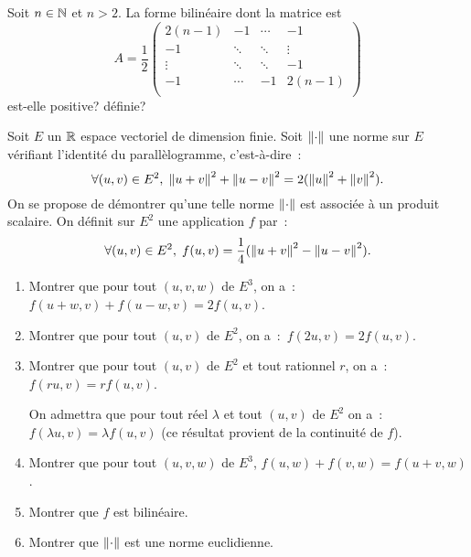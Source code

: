 \documentclass{tp_um}
\begin{document}
\exo[*]{} Soit $n\in\mathbb{N}$ et $n>2$. La forme bilinéaire dont la matrice est 
\[
        A =\frac{1}{2} \begin{pmatrix}
                2(n-1) & -1 & \cdots & -1 \\
                -1 & \ddots & \ddots & \vdots \\
                \vdots & \ddots & \ddots & -1 \\
                -1 & \cdots & -1 & 2(n-1) \\
        \end{pmatrix}
\]
est-elle positive? définie?

\newpage

Soit $E$ un $\mathbb{R}$ espace vectoriel de dimension finie. Soit $\lVert\cdot\rVert$ une norme sur $E$ vérifiant l'identité du parallèlogramme, c'est-à-dire~:
\[
\forall(u,v)\in E^2,\;\left\lVert u+v\right\rVert^2+\left\lVert u-v\right\rVert^2=2(\left\lVert u\right\rVert^2+\left\lVert v\right\rVert^2).
\]
On se propose de démontrer qu'une telle norme $\left\lVert\cdot\right\rVert$ est associée à un produit scalaire. On définit sur $E^2$ une application $f$ par~:~
\[
\forall(u,v)\in E^2,\;f(u,v)=\frac{1}{4}(\left\lVert u+v\right\rVert^2-\left\lVert u-v\right\rVert^2).
\]
\begin{enumerate}
\item  Montrer que pour tout $(u,v,w)$ de $E^3$, on a~:~$f(u+w,v)+f(u-w,v)=2f(u,v)$.
\item  Montrer que pour tout $(u,v)$ de $E^2$, on a~:~$f(2u,v)=2f(u,v)$.
\item  Montrer que pour tout $(u,v)$ de $E^2$ et tout rationnel $r$, on a~:~$f(ru,v)=rf(u,v)$.

On admettra que pour tout réel $\lambda$ et tout $(u,v)$ de $E^2$ on a~:~$f(\lambda u,v)=\lambda f(u,v)$ (ce résultat provient de la continuité de $f$).
\item  Montrer que pour tout $(u,v,w)$ de $E^3$, $f(u,w)+f(v,w)=f(u+v,w)$.
\item  Montrer que $f$ est bilinéaire.
\item  Montrer que $\left\lVert\cdot\right\rVert$ est une norme euclidienne.
\end{enumerate}

\end{document}
